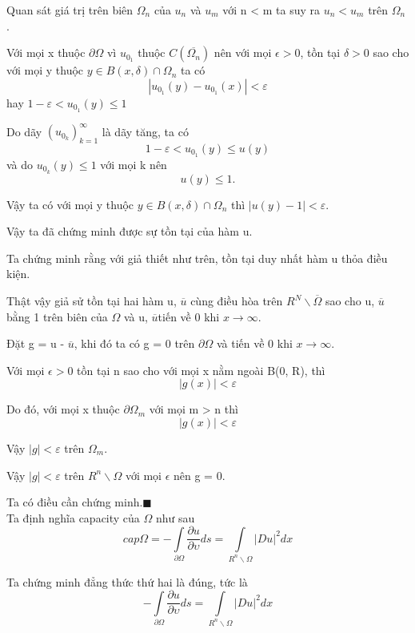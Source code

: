 Quan sát giá trị trên biên $\Omega_n$ của $u_n$ và $u_m$ với n < m ta suy ra $u_n < u_m$ trên $ \Omega_n$ .

Với mọi x thuộc $\partial \Omega$ vì $u_{0_1}$ thuộc $
C(\overline {\Omega_n } )
$ nên với mọi $\epsilon > 0$, tồn tại $\delta > 0$ sao cho với mọi y thuộc $
y \in B(x,\delta ) \cap \Omega _n 
$ ta có \[
\left| {u_{0_1 } (y) - u_{0_1 } (x)} \right| < \varepsilon 
\] 
hay 
$
1 - \varepsilon  < u_{0_1 } (y) \le 1
$

Do dãy $
\left( {u_{0_k } } \right)_{k = 1}^\infty  
$ là dãy tăng, ta có \[
1 - \varepsilon  < u_{0_1 } (y) \le u(y)
\] và do $u_{0_k } (y) \le 1$ với mọi k nên \[
u (y) \le 1 .
\]

 Vậy ta có với mọi y thuộc $
y \in B(x,\delta ) \cap \Omega _n 
$ thì 
$
\left| {u (y) - 1} \right| < \varepsilon 
$. 

Vậy ta đã chứng minh được sự tồn tại của hàm u.

Ta chứng minh rằng với giả thiết như trên, tồn tại duy nhất hàm u thỏa điều kiện.

Thật vậy giả sử tồn tại hai hàm u, $ \overline{u}$ cùng điều hòa trên $R^N \backslash \overline{\Omega} $ sao cho u, $ \overline{u}$ bằng 1 trên biên của $\Omega$ và u, $ \overline{u}$tiến về 0 khi $ x \to \infty$.

Đặt g = u - $ \overline{u}$, khi đó ta có g = 0 trên $\partial \Omega$ và tiến về 0 khi $ x \to \infty$.

Với mọi $ \epsilon > 0$ tồn tại n sao cho với mọi x nằm ngoài B(0, R), thì 
\[
\left| {g(x)} \right| < \varepsilon 
\]

Do đó, với mọi x thuộc $ \partial \Omega_m$ với mọi m > n thì 
\[
\left| {g(x)} \right| < \varepsilon 
\]

Vậy $\left| {g} \right| < \varepsilon $ trên $ \Omega_m $.

Vậy $\left| {g} \right| < \varepsilon $ trên $R^n \backslash \Omega $  với mọi $ \epsilon$ nên g = 0.

Ta có điều cần chứng minh.$\blacksquare$
\\

Ta định nghĩa capacity của $ \Omega$ như sau \[
cap\Omega  =  - \int\limits_{\partial \Omega } {\frac{{\partial u}}{{\partial \upsilon }}} ds = \int\limits_{R^n \backslash \Omega } {|Du|^2 dx} 
\]

Ta chứng minh đẳng thức thứ hai là đúng, tức là 
\[
 - \int\limits_{\partial \Omega } {\frac{{\partial u}}{{\partial \upsilon }}} ds = \int\limits_{R^n \backslash \Omega } {|Du|^2 dx} 
\]

